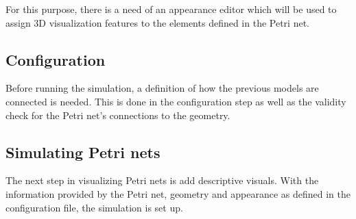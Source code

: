 For this purpose, there is a need of an appearance editor which will be used to assign 3D visualization features to the elements defined in the Petri net.

\subsection{Configuration}

Before running the simulation, a definition of how the previous models are connected is needed. This is done in the configuration step as well as the validity check for the Petri net's connections to the geometry. 

\subsection{Simulating Petri nets}
The next step in visualizing Petri nets is add descriptive visuals. With the information provided by the Petri net, geometry and appearance as defined in the configuration file, the simulation is set up.

